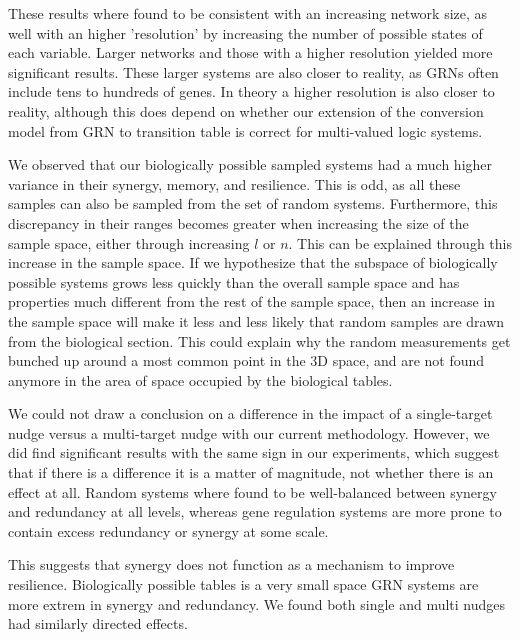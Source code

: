 \documentclass[../main.tex]{subfiles}
\begin{document}
These results where found to be consistent with an increasing network size, as well with an higher 'resolution' by increasing the number of possible states of each variable.
Larger networks and those with a higher resolution yielded more significant results.
These larger systems are also closer to reality, as GRNs often include tens to hundreds of genes.
In theory a higher resolution is also closer to reality, although this does depend on whether our extension of the conversion model from GRN to transition table is correct for multi-valued logic systems.

We observed that our biologically possible sampled systems had a much higher variance in their synergy, memory, and resilience.
This is odd, as all these samples can also be sampled from the set of random systems.
Furthermore, this discrepancy in their ranges becomes greater when increasing the size of the sample space, either through increasing $l$ or $n$.
This can be explained through this increase in the sample space.
If we hypothesize that the subspace of biologically possible systems grows less quickly than the overall sample space and has properties much different from the rest of the sample space, then an increase in the sample space will make it less and less likely that random samples are drawn from the biological section.
This could explain why the random measurements get bunched up around a most common point in the 3D space, and are not found anymore in the area of space occupied by the biological tables.

We could not draw a conclusion on a difference in the impact of a single-target nudge versus a multi-target nudge with our current methodology.
However, we did find significant results with the same sign in our experiments, which suggest that if there is a difference it is a matter of magnitude, not whether there is an effect at all.
Random systems where found to be well-balanced between synergy and redundancy at all levels, whereas gene regulation systems are more prone to contain excess redundancy or synergy at some scale.

This suggests that synergy does not function as a mechanism to improve resilience.
Biologically possible tables is a very small space
GRN systems are more extrem in synergy and redundancy.
We found both single and multi nudges had similarly directed effects.
\end{document}
